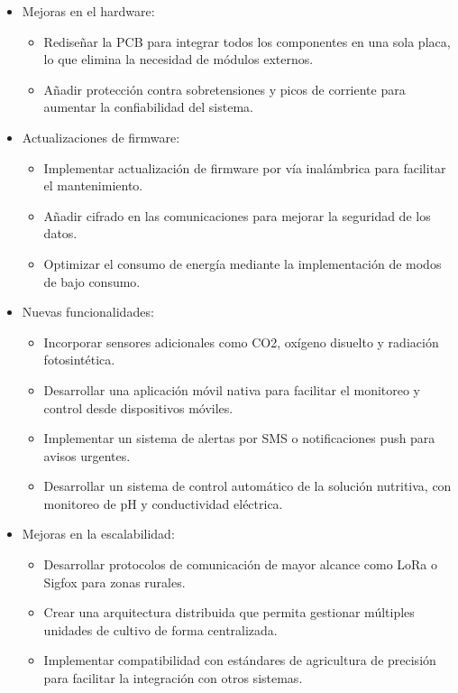 \begin{itemize}
    \item Mejoras en el hardware:
    \begin{itemize}
        \item Rediseñar la PCB para integrar todos los componentes en una sola placa, lo que elimina la necesidad de módulos externos.
        \item Añadir protección contra sobretensiones y picos de corriente para aumentar la confiabilidad del sistema.
    \end{itemize}
    
    \item Actualizaciones de firmware:
    \begin{itemize}
        \item Implementar actualización de firmware por vía inalámbrica para facilitar el mantenimiento.
        \item Añadir cifrado en las comunicaciones para mejorar la seguridad de los datos.
        \item Optimizar el consumo de energía mediante la implementación de modos de bajo consumo.
    \end{itemize}
    
    \item Nuevas funcionalidades:
    \begin{itemize}
        \item Incorporar sensores adicionales como CO2, oxígeno disuelto y radiación fotosintética.
        \item Desarrollar una aplicación móvil nativa para facilitar el monitoreo y control desde dispositivos móviles.
        \item Implementar un sistema de alertas por SMS o notificaciones push para avisos urgentes.
        \item Desarrollar un sistema de control automático de la solución nutritiva, con monitoreo de pH y conductividad eléctrica.
    \end{itemize}
    
    \item Mejoras en la escalabilidad:
    \begin{itemize}
        \item Desarrollar protocolos de comunicación de mayor alcance como LoRa o Sigfox para zonas rurales.
        \item Crear una arquitectura distribuida que permita gestionar múltiples unidades de cultivo de forma centralizada.
        \item Implementar compatibilidad con estándares de agricultura de precisión para facilitar la integración con otros sistemas.
    \end{itemize}
    

\end{itemize}
